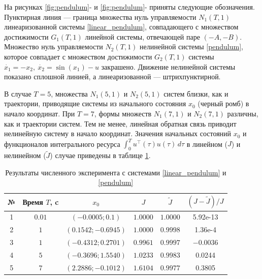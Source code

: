 \documentclass[../main.tex]{subfiles}
\begin{document}
\begin{pr}
\begin{figure}[ht!]
\end{figure}
 На рисунках  \ref{fig:pendulum}- и \ref{fig:pendulum}- приняты следующие обозначения. Пунктирная линия --- граница множества нуль управляемости $N_1(T,1)$ линеаризованной системы \eqref{linear_pendulum}, совпадающего с множеством достижимости $G_1(T,1)$ линейной системы, отвечающей паре $(-A,-B)$. Множество  нуль управляемости $ N_2(T,1) $ нелинейной системы \eqref{pendulum}, которое совпадает с множеством достижимости $G_2(T,1)$ системы $ \dot{x_1} = -x_2, \
    \dot{x_2} = \sin(x_1) - u$ закрашено.   Движение нелинейной системы показано сплошной линией, а линеаризованной --- штрихпунктирной. 

В случае $ T = 5$, множества  $N_1(5,1) $  и $ N_2(5,1) $ систем  близки, как и траектории, приводящие системы из начального состояния $x_0$ (черный ромб) в начало координат.  При $T = 7$, формы множеств $N_1(7,1) $ и  $ N_2(7,1) $ различны, как и траектории систем. Тем не менее, линейная обратная связь приводит нелинейную систему в начало координат.
Значения начальных состояний $x_0$ и функционалов интегрального ресурса $ \displaystyle{\int_0^T u^{\top}(\tau) u(\tau) \, d\tau}$ в линейном ($ J $) и нелинейном ($ \widetilde{J} $) случае приведены в таблице \ref{Example1_table}.
\end{pr}
\begin{table}[h!]
\begin{center}
\caption{Результаты численного эксперимента с системами \eqref{linear_pendulum} и \eqref{pendulum}}
\label{Example1_table}
\begin{tabular}{c|c|c|c|c|c}
№       & Время $T$, c    &  $x_0$                  & $ J $                & $ \widetilde{J} $  & $  ( J -  \widetilde{J} ) / J$ \\ \hline
1       & $0.01 $         & $ (-0.0005; 0.1) $      & $ 1.0000 $           & $ 1.0000 $         &  5.92e-13  \\ \hline %
2       & $ 1 $           & $ (0.1542; -0.6945) $   & $ 1.0000 $           & $ 0.9998 $         &  1.36e-4  \\ \hline %
3       & $ 1 $           & $ (-0.4312; 0.2701) $   & $ 0.9961 $           & $ 0.9997 $         &  $-0.0036$  \\ \hline %
4       & $5 $            & $ (-0.3696; 1.5540) $   & $ 1.0233 $           & $ 0.9983 $         & 0.0244   \\ \hline %
5       & $ 7 $           & $ (2.2886; -0.1012) $   & $ 1.6104 $           & $ 0.9977 $         & 0.3805   %
\end{tabular}
\end{center}
\end{table}
\end{document}
